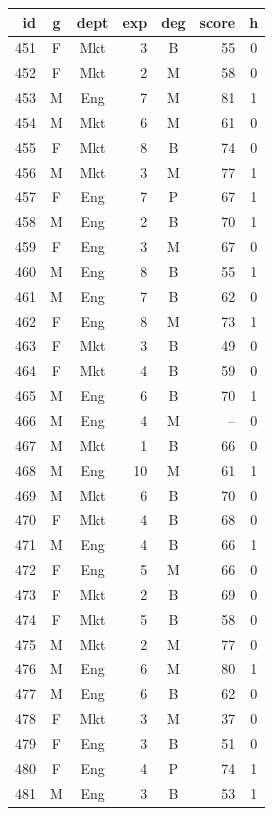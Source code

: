 \documentclass[11pt,a4paper]{article}
\renewcommand{\arraystretch}{1.15}
\begin{document}
\begin{center}\scriptsize\setlength{\tabcolsep}{3.5pt}\renewcommand{\arraystretch}{1.0}
\begin{tabular}[t]{@{}r c c r c r c@{}}
\toprule
id & g & dept & exp & deg & score & h \\
\midrule
451 & F & Mkt & 3 & B & 55 & 0 \\
452 & F & Mkt & 2 & M & 58 & 0 \\
453 & M & Eng & 7 & M & 81 & 1 \\
454 & M & Mkt & 6 & M & 61 & 0 \\
455 & F & Mkt & 8 & B & 74 & 0 \\
456 & M & Mkt & 3 & M & 77 & 1 \\
457 & F & Eng & 7 & P & 67 & 1 \\
458 & M & Eng & 2 & B & 70 & 1 \\
459 & F & Eng & 3 & M & 67 & 0 \\
460 & M & Eng & 8 & B & 55 & 1 \\
461 & M & Eng & 7 & B & 62 & 0 \\
462 & F & Eng & 8 & M & 73 & 1 \\
463 & F & Mkt & 3 & B & 49 & 0 \\
464 & F & Mkt & 4 & B & 59 & 0 \\
465 & M & Eng & 6 & B & 70 & 1 \\
466 & M & Eng & 4 & M & -- & 0 \\
467 & M & Mkt & 1 & B & 66 & 0 \\
468 & M & Eng & 10 & M & 61 & 1 \\
469 & M & Mkt & 6 & B & 70 & 0 \\
470 & F & Mkt & 4 & B & 68 & 0 \\
471 & M & Eng & 4 & B & 66 & 1 \\
472 & F & Eng & 5 & M & 66 & 0 \\
473 & F & Mkt & 2 & B & 69 & 0 \\
474 & F & Mkt & 5 & B & 58 & 0 \\
475 & M & Mkt & 2 & M & 77 & 0 \\
476 & M & Eng & 6 & M & 80 & 1 \\
477 & M & Eng & 6 & B & 62 & 0 \\
478 & F & Mkt & 3 & M & 37 & 0 \\
479 & F & Eng & 3 & B & 51 & 0 \\
480 & F & Eng & 4 & P & 74 & 1 \\
481 & M & Eng & 3 & B & 53 & 1 \\

\end{tabular}
\end{center}
\end{document}

